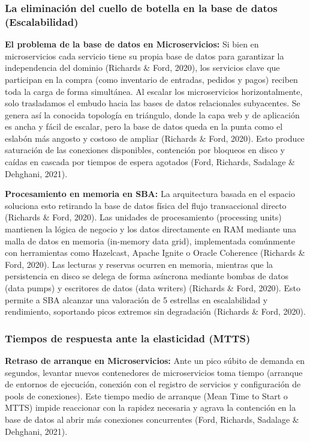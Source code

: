 \documentclass[12pt, a4paper]{article}
\begin{document}
    \subsubsection{La eliminación del cuello de botella en la base de datos (Escalabilidad)}
    \textbf{El problema de la base de datos en Microservicios:} Si bien en microservicios cada servicio tiene su propia base de datos para garantizar la independencia del dominio (Richards \& Ford, 2020), los servicios clave que participan en la compra (como inventario de entradas, pedidos y pagos) reciben toda la carga de forma simultánea. Al escalar los microservicios horizontalmente, solo trasladamos el embudo hacia las bases de datos relacionales subyacentes. Se genera así la conocida topología en triángulo, donde la capa web y de aplicación es ancha y fácil de escalar, pero la base de datos queda en la punta como el eslabón más angosto y costoso de ampliar (Richards \& Ford, 2020). Esto produce saturación de las conexiones disponibles, contención por bloqueos en disco y caídas en cascada por tiempos de espera agotados (Ford, Richards, Sadalage \& Dehghani, 2021).

    \textbf{Procesamiento en memoria en SBA:} La arquitectura basada en el espacio soluciona esto retirando la base de datos física del flujo transaccional directo (Richards \& Ford, 2020). Las unidades de procesamiento (processing units) mantienen la lógica de negocio y los datos directamente en RAM mediante una malla de datos en memoria (in-memory data grid), implementada comúnmente con herramientas como Hazelcast, Apache Ignite o Oracle Coherence (Richards \& Ford, 2020). Las lecturas y reservas ocurren en memoria, mientras que la persistencia en disco se delega de forma asíncrona mediante bombas de datos (data pumps) y escritores de datos (data writers) (Richards \& Ford, 2020). Esto permite a SBA alcanzar una valoración de 5 estrellas en escalabilidad y rendimiento, soportando picos extremos sin degradación (Richards \& Ford, 2020).
    \subsubsection{Tiempos de respuesta ante la elasticidad (MTTS)}
    \textbf{Retraso de arranque en Microservicios:} Ante un pico súbito de demanda en segundos, levantar nuevos contenedores de microservicios toma tiempo (arranque de entornos de ejecución, conexión con el registro de servicios y configuración de pools de conexiones). Este tiempo medio de arranque (Mean Time to Start o MTTS) impide reaccionar con la rapidez necesaria y agrava la contención en la base de datos al abrir más conexiones concurrentes (Ford, Richards, Sadalage \& Dehghani, 2021).
\end{document}
